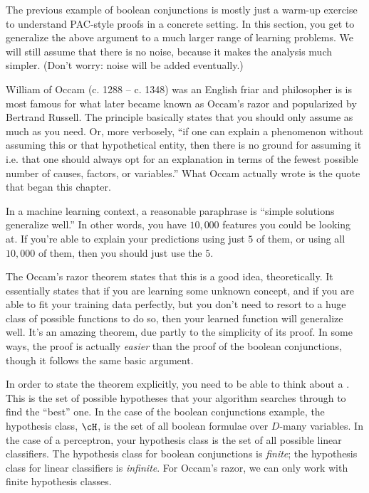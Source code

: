 The previous example of boolean conjunctions is mostly just a warm-up
exercise to understand PAC-style proofs in a concrete setting.  In
this section, you get to generalize the above argument to a much
larger range of learning problems.  We will still assume that there is
no noise, because it makes the analysis much simpler.  (Don't worry:
noise will be added eventually.)

William of Occam (c. 1288 -- c. 1348) was an English friar and
philosopher is is most famous for what later became known as Occam's
razor and popularized by Bertrand Russell.  The principle basically
states that you should only assume as much as you need.  Or, more
verbosely, ``if one can explain a phenomenon without assuming this or
that hypothetical entity, then there is no ground for assuming it
i.e. that one should always opt for an explanation in terms of the
fewest possible number of causes, factors, or variables.''  What Occam
actually wrote is the quote that began this chapter.

In a machine learning context, a reasonable paraphrase is ``simple
solutions generalize well.''  In other words, you have $10,000$
features you could be looking at.  If you're able to explain your
predictions using just $5$ of them, or using all $10,000$ of them,
then you should just use the $5$.

The Occam's razor theorem states that this is a good idea,
theoretically.  It essentially states that if you are learning some
unknown concept, and if you are able to fit your training data
perfectly, but you don't need to resort to a huge class of possible
functions to do so, then your learned function will generalize well.
It's an amazing theorem, due partly to the simplicity of its proof.
In some ways, the proof is actually \emph{easier} than the proof of
the boolean conjunctions, though it follows the same basic argument.

In order to state the theorem explicitly, you need to be able to think
about a .  This is the set of possible
hypotheses that your algorithm searches through to find the ``best''
one.  In the case of the boolean conjunctions example, the hypothesis
class, $\cH$, is the set of all boolean formulae over $D$-many
variables.  In the case of a perceptron, your hypothesis class is the
set of all possible linear classifiers.  The hypothesis class for
boolean conjunctions is \emph{finite}; the hypothesis class for linear
classifiers is \emph{infinite}.  For Occam's razor, we can only work
with finite hypothesis classes.


